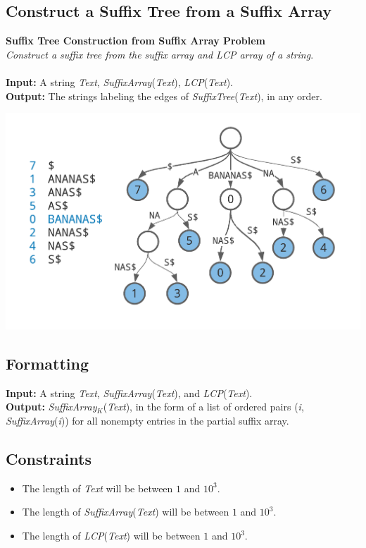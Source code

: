 \documentclass{article}
\begin{document}
\subsection{Construct a Suffix Tree from a Suffix Array}
\hline\vspace{5}
\noindent \textbf{Suffix Tree Construction from Suffix Array Problem}\\
\emph{Construct a suffix tree from the suffix array and LCP array of a string}.\\ \\
\textbf{Input:} A string \emph{Text}, \emph{SuffixArray}(\emph{Text}), \emph{LCP}(\emph{Text}).\\
\textbf{Output:} The strings labeling the edges of \emph{SuffixTree}(\emph{Text}), in any order.
\begin{center}
    \includegraphics[scale=0.2]{c9/logos/9R.png} 
\end{center}
\hline\vspace{5}

\subsection*{Formatting}
\textbf{Input:} A string \emph{Text}, \emph{SuffixArray}(\emph{Text}), and \emph{LCP}(\emph{Text}).\\
\noindent \textbf{Output:} \emph{SuffixArray}$_K$(\emph{Text}), in the form of a list of ordered pairs (\emph{i}, \emph{SuffixArray}(\emph{i})) for all nonempty entries in the partial suffix array.

\subsection*{Constraints}
\begin{itemize}
    \item The length of \emph{Text} will be between $1$ and $10^3$.
    \item The length of \emph{SuffixArray}(\emph{Text}) will be between $1$ and $10^3$.
    \item The length of \emph{LCP}(\emph{Text}) will be between $1$ and $10^3$.
\end{itemize}
\pagebreak
\end{document}
